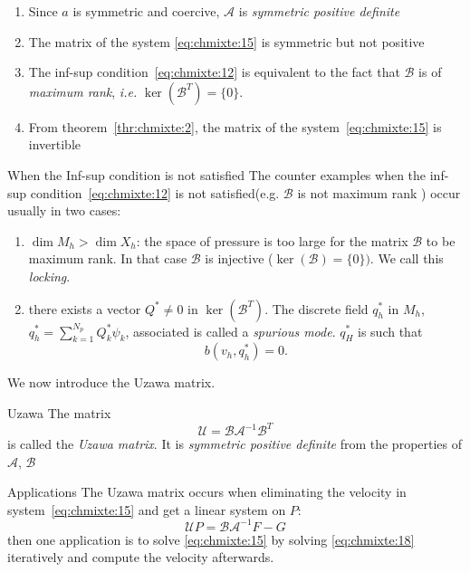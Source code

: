   \begin{remark}
    \label{rem:2}
    \begin{enumerate}
    \item Since $a$ is symmetric and coercive, $\mathcal{A}$ is \emph{symmetric
       positive definite}
     \item The matrix of the system \eqref{eq:chmixte:15} is symmetric but not positive
     \item The inf-sup condition~\eqref{eq:chmixte:12} is equivalent to the fact that
       $\mathcal{B}$ is of \emph{maximum rank}, \emph{i.e.} $\ker(\mathcal{B}^T)
       = \{0 \}$.
     \item From theorem~\ref{thr:chmixte:2}, the matrix of the system~\eqref{eq:chmixte:15} is
       invertible
    \end{enumerate}
  \end{remark}


  \begin{block}{When the Inf-sup condition is not satisfied}
    The counter examples when the inf-sup condition~\eqref{eq:chmixte:12} is not
    satisfied(e.g. $\mathcal{B}$ is not maximum rank ) occur usually in two
    cases:
    \begin{enumerate}
    \item $\dim {M_h} > \dim {X_h}$: the space of pressure is too large for the
      matrix $\mathcal{B}$ to be maximum rank. In that case $\mathcal{B}$ is
      injective ($\ker(\mathcal{B}) = \{0\})$. We call this \emph{locking}.
    \item there exists a vector $Q^* \neq 0$ in $\ker(\mathcal{B}^T)$. The
      discrete field $q^*_h$ in $M_h$, $q^*_h=\sum_{k=1}^{N_p} Q^*_k \psi_k$,
      associated is called a \emph{spurious mode}. $q^*_H$ is such that
      \begin{equation}
        \label{eq:chmixte:14}
        b(v_h,q^*_h)=0.
      \end{equation}

    \end{enumerate}
  \end{block}

We now introduce the Uzawa matrix.
\begin{block}{Uzawa}
  The matrix
    \begin{equation}
      \label{eq:chmixte:17}
      \mathcal{U} = \mathcal{B} \mathcal{A}^{-1} \mathcal{B}^T
    \end{equation}
    is called the \emph{Uzawa matrix}. It is \emph{symmetric positive definite}
    from the properties of $\mathcal{A}$, $\mathcal{B}$
  \end{block}
  \begin{block}{Applications}
    The Uzawa matrix occurs when eliminating the velocity in
    system~\eqref{eq:chmixte:15} and get a linear system on $P$:
    \begin{equation}
      \label{eq:chmixte:18}
      \mathcal{U} P = \mathcal{B} \mathcal{A}^{-1} F - G
    \end{equation}
    then one application is to solve \eqref{eq:chmixte:15} by solving \eqref{eq:chmixte:18}
    iteratively and compute the velocity afterwards.
  \end{block}

